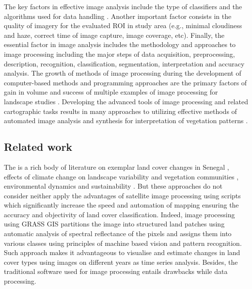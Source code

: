 \documentclass[land,article,submit,pdftex,moreauthors]{Definitions/mdpi}
\begin{document}
The key factors in effective image analysis include the type of classifiers and the algorithms used for data handling \cite{Lemenkova202212}. Another important factor consists in the quality of imagery for the evaluated ROI in study area (e.g., minimal cloudiness and haze, correct time of image capture, image coverage, etc). Finally, the essential factor in image analysis includes the methodology and approaches to image processing including the major steps of data acquisition, preprocessing, description, recognition, classification, segmentation, interpretation and accuracy analysis. The growth of methods of image processing during the development of computer-based methods and programming approaches are the primary factors of gain in volume and success of multiple examples of image processing for landscape studies \cite{Duncan,jimaging9050098,Purkis,info14040249,DIOUF2001129}. Developing the advanced tools of image processing and related cartographic tasks results in many approaches to utilizing effective methods of automated image analysis and synthesis for interpretation of vegetation patterns \cite{SUOMALAINEN2021112691,OlsonAnderson,Lemenkova202227,Ali,Olsonetal2019,Lemenkova202229}.

\subsection{Related work}

The is a rich body of literature on exemplar land cover changes in Senegal \cite{WOOD2004565,ELBERLING200337,Hiraldo}, effects of climate change on landscape variability and vegetation communities \cite{LIU2004583,TSCHAKERT2004535,LUFAFA20081}, environmental dynamics and sustainability \cite{CAMARA2017204}. But these approaches do not consider neither apply the advantages of satellite image processing using scripts which significantly increase the speed and automation of mapping ensuring the accuracy and objectivity of land cover classification. Indeed, image processing using GRASS GIS partitions the image into structured land patches using automatic analysis of spectral reflectance of the pixels and assigns them into various classes using principles of machine based vision and pattern recognition. Such approach makes it advantageous to visualise and estimate changes in land cover types using images on different years as time series analysis. Besides, the traditional software used for image processing entails drawbacks while data processing. 
\end{document}
